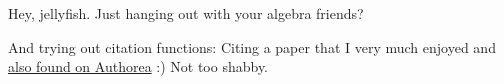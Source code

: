 Hey, jellyfish. Just hanging out with your algebra friends?

And trying out citation functions: \cite{2014PLSCB..10E3542G} Citing a paper that I very much enjoyed and \href{https://www.authorea.com/users/3/articles/3410/_show_article}{also found on Authorea} :) Not too shabby.


    
    
    
    
    
  